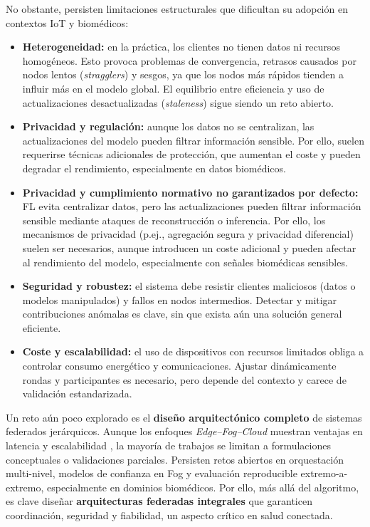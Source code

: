 \documentclass{report}
\begin{document}
No obstante, persisten limitaciones estructurales que dificultan su adopción en contextos IoT y biomédicos:

\begin{itemize}
    \item \textbf{Heterogeneidad:} en la práctica, los clientes no tienen datos ni recursos homogéneos. Esto provoca problemas de convergencia, retrasos causados por nodos lentos (\textit{stragglers}) y sesgos, ya que los nodos más rápidos tienden a influir más en el modelo global. El equilibrio entre eficiencia y uso de actualizaciones desactualizadas (\textit{staleness}) sigue siendo un reto abierto.

    \item \textbf{Privacidad y regulación:} aunque los datos no se centralizan, las actualizaciones del modelo pueden filtrar información sensible. Por ello, suelen requerirse técnicas adicionales de protección, que aumentan el coste y pueden degradar el rendimiento, especialmente en datos biomédicos.

    \item \textbf{Privacidad y cumplimiento normativo no garantizados por defecto:} FL evita centralizar datos, pero las actualizaciones pueden filtrar información sensible mediante ataques de reconstrucción o inferencia. Por ello, los mecanismos de privacidad (p.ej., agregación segura y privacidad diferencial) suelen ser necesarios, aunque introducen un coste adicional y pueden afectar al rendimiento del modelo, especialmente con señales biomédicas sensibles.
    
\item \textbf{Seguridad y robustez:} el sistema debe resistir clientes maliciosos (datos o modelos manipulados) y fallos en nodos intermedios. Detectar y mitigar contribuciones anómalas es clave, sin que exista aún una solución general eficiente.

\item \textbf{Coste y escalabilidad:} el uso de dispositivos con recursos limitados obliga a controlar consumo energético y comunicaciones. Ajustar dinámicamente rondas y participantes es necesario, pero depende del contexto y carece de validación estandarizada.

\end{itemize}
Un reto aún poco explorado es el \textbf{diseño arquitectónico completo} de sistemas federados jerárquicos. Aunque los enfoques \textit{Edge--Fog--Cloud} muestran ventajas en latencia y escalabilidad \cite{shi2020communication,liu2022hierarchical,prigent2024flcontinuum,moussa2023decentralised}, la mayoría de trabajos se limitan a formulaciones conceptuales o validaciones parciales. Persisten retos abiertos en orquestación multi-nivel, modelos de confianza en Fog y evaluación reproducible extremo-a-extremo, especialmente en dominios biomédicos.
Por ello, más allá del algoritmo, es clave diseñar \textbf{arquitecturas federadas integrales} que garanticen coordinación, seguridad y fiabilidad, un aspecto crítico en salud conectada.
\end{document}
